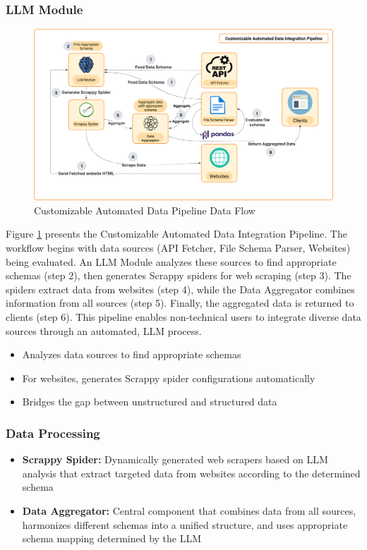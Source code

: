 \subsubsection{LLM Module}

\begin{figure}[htbp]
	\centering
	\includegraphics[width=1\textwidth]{assets/customizable-automated-data-integration-pipeline.png}
	\caption{Customizable Automated Data Pipeline Data Flow}
	\label{fig:customizable-automated-data-integration-pipeline-data-flow}
\end{figure}

\noindent Figure \ref{fig:customizable-automated-data-integration-pipeline-data-flow} presents the Customizable Automated Data Integration Pipeline. The workflow begins with data sources (API Fetcher, File Schema Parser, Websites) being evaluated. An LLM Module analyzes these sources to find appropriate schemas (step 2), then generates Scrappy spiders for web scraping (step 3). The spiders extract data from websites (step 4), while the Data Aggregator combines information from all sources (step 5). Finally, the aggregated data is returned to clients (step 6). This pipeline enables non-technical users to integrate diverse data sources through an automated, LLM process.

\begin{itemize}
    \item Analyzes data sources to find appropriate schemas
    \item For websites, generates Scrappy spider configurations automatically
    \item Bridges the gap between unstructured and structured data
\end{itemize}

\subsubsection{Data Processing}
\begin{itemize}
    \item \textbf{Scrappy Spider:} Dynamically generated web scrapers based on LLM analysis that extract targeted data from websites according to the determined schema
    \item \textbf{Data Aggregator:} Central component that combines data from all sources, harmonizes different schemas into a unified structure, and uses appropriate schema mapping determined by the LLM
\end{itemize}

